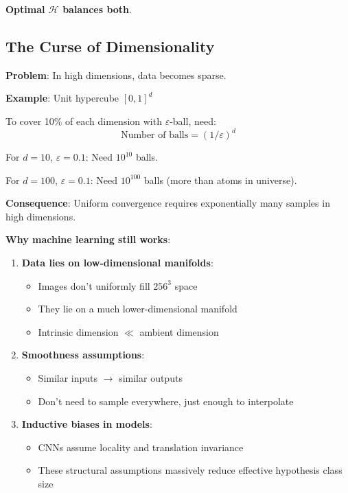 \textbf{Optimal $\mathcal{H}$ balances both}.

\subsection{The Curse of Dimensionality}

\textbf{Problem}: In high dimensions, data becomes sparse.

\textbf{Example}: Unit hypercube $[0,1]^d$

To cover 10\% of each dimension with $\varepsilon$-ball, need:
\begin{equation}
\text{Number of balls} = (1/\varepsilon)^d
\end{equation}

For $d=10$, $\varepsilon=0.1$: Need $10^{10}$ balls.

For $d=100$, $\varepsilon=0.1$: Need $10^{100}$ balls (more than atoms in universe).

\textbf{Consequence}: Uniform convergence requires exponentially many samples in high dimensions.

\textbf{Why machine learning still works}:

\begin{enumerate}
    \item \textbf{Data lies on low-dimensional manifolds}:
    \begin{itemize}
        \item Images don't uniformly fill $256^3$ space
        \item They lie on a much lower-dimensional manifold
        \item Intrinsic dimension $\ll$ ambient dimension
    \end{itemize}

    \item \textbf{Smoothness assumptions}:
    \begin{itemize}
        \item Similar inputs $\rightarrow$ similar outputs
        \item Don't need to sample everywhere, just enough to interpolate
    \end{itemize}

    \item \textbf{Inductive biases in models}:
    \begin{itemize}
        \item CNNs assume locality and translation invariance
        \item These structural assumptions massively reduce effective hypothesis class size
    \end{itemize}
\end{enumerate}

